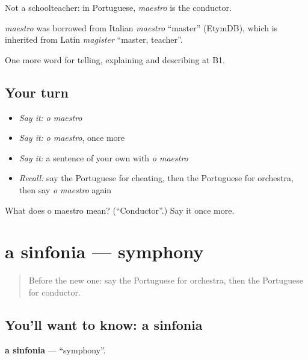 Not a schoolteacher: in Portuguese, \emph{maestro} is the conductor.

\begin{cousinweb}
\emph{maestro} was borrowed from Italian \emph{maestro} \textquotedblleft{}master\textquotedblright{} (EtymDB), which is inherited from Latin \emph{magister} \textquotedblleft{}master, teacher\textquotedblright{}.
\end{cousinweb}

\begin{grammarlens}[title={What you've built}]
One more word for telling, explaining and describing at B1.
\end{grammarlens}

\subsection*{Your turn}
\begin{itemize}
\raggedright
  \item \emph{Say it:} \emph{o maestro}
  \item \emph{Say it:} \emph{o maestro}, once more
  \item \emph{Say it:} a sentence of your own with \emph{o maestro}
  \item \emph{Recall:} say the Portuguese for cheating, then the Portuguese for orchestra, then say \emph{o maestro} again
\end{itemize}

\begin{tcolorbox}[breakable,colback=teal!4,colframe=teal!35!black,title={Before you move on}]
What does o maestro mean? (\textquotedblleft{}Conductor\textquotedblright{}.) Say it once more.
\end{tcolorbox}
\section[a sinfonia]{a sinfonia — symphony}

\label{lesson:PT-C516-sinfonia}



\begin{quote}
Before the new one: say the Portuguese for orchestra, then the Portuguese for conductor.
\end{quote}

\subsection*{You'll want to know: a sinfonia}
\textbf{a sinfonia} — \textquotedblleft{}symphony\textquotedblright{}.

